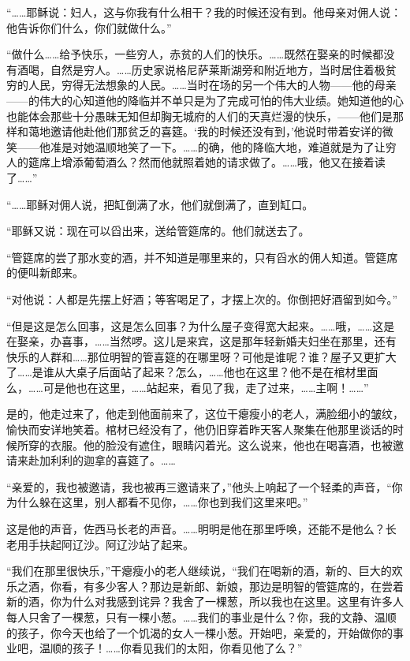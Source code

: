 \par “……耶稣说：妇人，这与你我有什么相干？我的时候还没有到。他母亲对佣人说：他告诉你们什么，你们就做什么。”
\par “做什么……给予快乐，一些穷人，赤贫的人们的快乐。……既然在娶亲的时候都没有酒喝，自然是穷人。……历史家说格尼萨莱斯湖旁和附近地方，当时居住着极贫穷的人民，穷得无法想象的人民。……当时在场的另一个伟大的人物——他的母亲——的伟大的心知道他的降临并不单只是为了完成可怕的伟大业绩。她知道他的心也能体会那些十分愚昧无知但却胸无城府的人们的天真烂漫的快乐，——他们是那样和蔼地邀请他赴他们那贫乏的喜筵。‘我的时候还没有到，’他说时带着安详的微笑——他准是对她温顺地笑了一下。……的确，他的降临大地，难道就是为了让穷人的筵席上增添葡萄酒么？然而他就照着她的请求做了。……哦，他又在接着读了……”
\par “……耶稣对佣人说，把缸倒满了水，他们就倒满了，直到缸口。
\par “耶稣又说：现在可以舀出来，送给管筵席的。他们就送去了。
\par “管筵席的尝了那水变的酒，并不知道是哪里来的，只有舀水的佣人知道。管筵席的便叫新郎来。
\par “对他说：人都是先摆上好酒；等客喝足了，才摆上次的。你倒把好酒留到如今。”
\par “但是这是怎么回事，这是怎么回事？为什么屋子变得宽大起来。……哦，……这是在娶亲，办喜事，……当然啰。这儿是来宾，这是那年轻新婚夫妇坐在那里，还有快乐的人群和……那位明智的管喜筵的在哪里呀？可他是谁呢？谁？屋子又更扩大了……是谁从大桌子后面站了起来？怎么，……他也在这里？他不是在棺材里面么，……可是他也在这里，……站起来，看见了我，走了过来，……主啊！……”
\par 是的，他走过来了，他走到他面前来了，这位干瘪瘦小的老人，满脸细小的皱纹，愉快而安详地笑着。棺材已经没有了，他仍旧穿着昨天客人聚集在他那里谈话的时候所穿的衣服。他的脸没有遮住，眼睛闪着光。这么说来，他也在喝喜酒，也被邀请来赴加利利的迦拿的喜筵了。……
\par “亲爱的，我也被邀请，我也被再三邀请来了，”他头上响起了一个轻柔的声音，“你为什么躲在这里，别人都看不见你，……你也到我们这里来吧。”
\par 这是他的声音，佐西马长老的声音。……明明是他在那里呼唤，还能不是他么？长老用手扶起阿辽沙。阿辽沙站了起来。
\par “我们在那里很快乐，”干瘪瘦小的老人继续说，“我们在喝新的酒，新的、巨大的欢乐之酒，你看，有多少客人？那边是新郎、新娘，那边是明智的管筵席的，在尝着新的酒，你为什么对我感到诧异？我舍了一棵葱，所以我也在这里。这里有许多人每人只舍了一棵葱，只有一棵小葱。……我们的事业是什么？你，我的文静、温顺的孩子，你今天也给了一个饥渴的女人一棵小葱。开始吧，亲爱的，开始做你的事业吧，温顺的孩子！……你看见我们的太阳，你看见他了么？”

